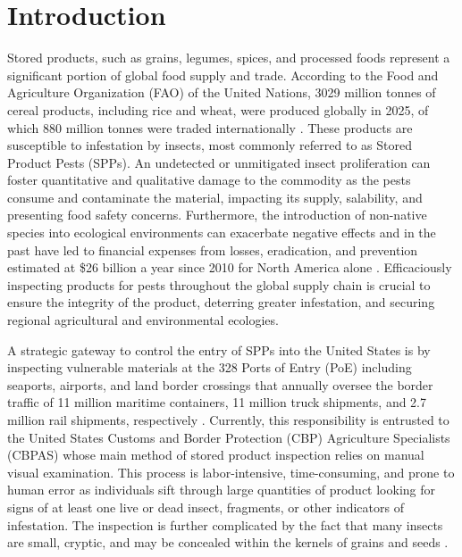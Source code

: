 \documentclass[../Vibro-Acoustic Signatures and Detection Algorithms for Stored Product Insects.tex]{subfiles}
\begin{document}
\chapter{Introduction}

Stored products, such as grains, legumes, spices, and processed foods represent a significant portion of global food supply and trade. According to the Food and Agriculture Organization (FAO) of the United Nations, 3029 million tonnes of cereal products, including rice and wheat, were produced globally in 2025, of which 880 million tonnes were traded internationally \cite{FoodOutlookBiannual2025}. These products are susceptible to infestation by insects, most commonly referred to as Stored Product Pests (SPPs). An undetected or unmitigated insect proliferation can foster quantitative and qualitative damage to the commodity as the pests consume and contaminate the material, impacting its supply, salability, and presenting food safety concerns. Furthermore, the introduction of non-native species into ecological environments can exacerbate negative effects and in the past have led to financial expenses from losses, eradication, and prevention estimated at \$26 billion a year since 2010 for North America alone \cite{crystal-ornelasEconomicCostsBiological2021}. Efficaciously inspecting products for pests throughout the global supply chain is crucial to ensure the integrity of the product, deterring greater infestation, and securing regional agricultural and environmental ecologies.

A strategic gateway to control the entry of SPPs into the United States is by inspecting vulnerable materials at the 328 Ports of Entry (PoE) including seaports, airports, and land border crossings that annually oversee the border traffic of 11 million maritime containers, 11 million truck shipments, and 2.7 million rail shipments, respectively \cite{PortsEntryUS2025}. Currently, this responsibility is entrusted to the United States Customs and Border Protection (CBP) Agriculture Specialists (CBPAS) whose main method of stored product inspection relies on manual visual examination. This process is labor-intensive, time-consuming, and prone to human error as individuals sift through large quantities of product looking for signs of at least one live or dead insect, fragments, or other indicators of infestation. The inspection is further complicated by the fact that many insects are small, cryptic, and may be concealed within the kernels of grains and seeds \cite{service2015a}. 
\end{document}
